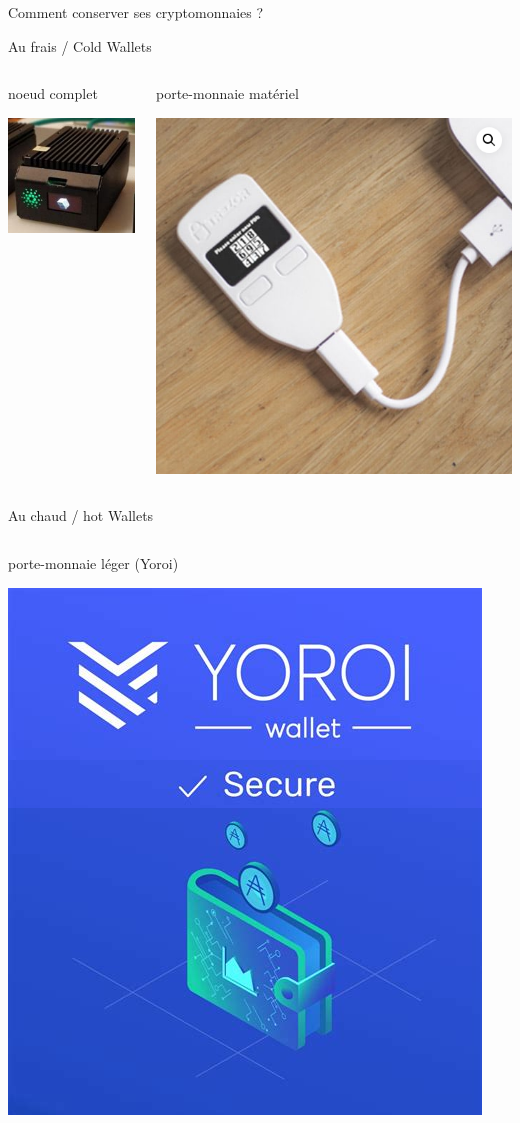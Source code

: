 \documentclass[presentation]{beamer}
\begin{document}
\begin{frame}[label={sec:orgd5fe886}]{Comment conserver ses cryptomonnaies ?}
\begin{block}{\alert{Au frais / Cold Wallets}}
\begin{columns}
\begin{column}{0.50\columnwidth}
\begin{block}{noeud complet}
\begin{center}
\includegraphics[width=.25\linewidth]{./Pictures/cardano/node.png}
\end{center}
\end{block}
\end{column}

\begin{column}{0.50\columnwidth}
\begin{block}{porte-monnaie matériel}
\begin{center}
\includegraphics[width=.25\linewidth]{./Pictures/wallet_trezor.png}
\end{center}
\end{block}
\end{column}
\end{columns}
\end{block}

\begin{block}{\alert{Au chaud / hot Wallets}}
\begin{columns}
\begin{column}{0.50\columnwidth}
\begin{block}{porte-monnaie léger (Yoroi)}
\begin{center}
\includegraphics[width=.25\linewidth]{./Pictures/cardano/yoroi-small.png}
\end{center}
\end{block}
\end{column}


\end{columns}
\end{block}
\end{frame}
\end{document}
